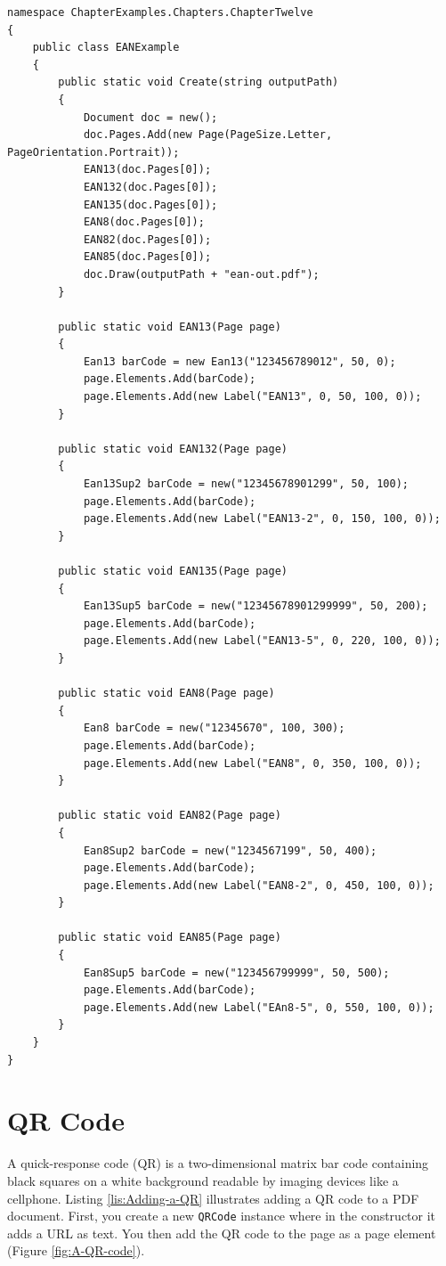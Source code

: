 \documentclass[american]{tufte-book}
\numberwithin{equation}{section}
\numberwithin{figure}{section}
\begin{document}
{\begin{lstlisting}[caption={Adding EAN codes to a PDF document.},label={lis:Adding-EAN-codes},basicstyle={\footnotesize\ttfamily},breaklines=true]
namespace ChapterExamples.Chapters.ChapterTwelve
{
    public class EANExample
    {
        public static void Create(string outputPath)
        {
            Document doc = new();
            doc.Pages.Add(new Page(PageSize.Letter, PageOrientation.Portrait));
            EAN13(doc.Pages[0]);
            EAN132(doc.Pages[0]);
            EAN135(doc.Pages[0]);
            EAN8(doc.Pages[0]);
            EAN82(doc.Pages[0]);
            EAN85(doc.Pages[0]);
            doc.Draw(outputPath + "ean-out.pdf");
        }

        public static void EAN13(Page page)
        {
            Ean13 barCode = new Ean13("123456789012", 50, 0);
            page.Elements.Add(barCode);
            page.Elements.Add(new Label("EAN13", 0, 50, 100, 0));
        }

        public static void EAN132(Page page)
        {
            Ean13Sup2 barCode = new("12345678901299", 50, 100);
            page.Elements.Add(barCode);
            page.Elements.Add(new Label("EAN13-2", 0, 150, 100, 0));
        }

        public static void EAN135(Page page)
        {
            Ean13Sup5 barCode = new("12345678901299999", 50, 200);
            page.Elements.Add(barCode);
            page.Elements.Add(new Label("EAN13-5", 0, 220, 100, 0));
        }

        public static void EAN8(Page page)
        {
            Ean8 barCode = new("12345670", 100, 300);
            page.Elements.Add(barCode);
            page.Elements.Add(new Label("EAN8", 0, 350, 100, 0));
        }

        public static void EAN82(Page page)
        {
            Ean8Sup2 barCode = new("1234567199", 50, 400);
            page.Elements.Add(barCode);
            page.Elements.Add(new Label("EAN8-2", 0, 450, 100, 0));
        }

        public static void EAN85(Page page)
        {
            Ean8Sup5 barCode = new("123456799999", 50, 500);
            page.Elements.Add(barCode);
            page.Elements.Add(new Label("EAn8-5", 0, 550, 100, 0));
        }
    }
}
\end{lstlisting}
\leavevmode\egroup


\section{QR Code}
A quick-response code (QR) is a two-dimensional matrix bar code containing black squares on a white background readable by imaging
devices like a cellphone. Listing \ref{lis:Adding-a-QR} illustrates adding a QR code to a PDF document. First, you create a
new \texttt{QRCode} instance where in the constructor it adds a URL
as text. You then add the QR code to the page as a page element (Figure
\ref{fig:A-QR-code}).

}
\end{document}

